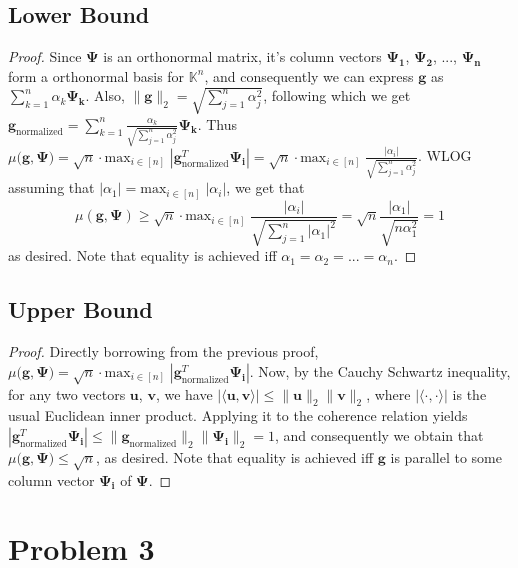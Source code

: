 \documentclass[a4paper,11pt]{article}
\numberwithin{definition}{section}
\numberwithin{mytheorem}{subsection}
\begin{document}
\subsection{Lower Bound}
\begin{proof}
Since $\boldsymbol{\Psi}$ is an orthonormal matrix, it's column vectors $\boldsymbol{\Psi_1}$, $\boldsymbol{\Psi_2}$, ..., $\boldsymbol{\Psi_n}$ form a orthonormal basis for $\mathbb{K}^n$, and consequently we can express $\boldsymbol{g}$ as $\sum_{k=1}^{n} \alpha_k\boldsymbol{\Psi_k}$. Also, $\lVert \boldsymbol{g}\rVert_2 = \sqrt{\sum_{j=1}^{n} \alpha^2_j}$, following which we get $\boldsymbol{g}_{\mathrm{normalized}} = \sum_{k=1}^{n} \frac{\alpha_k}{\sqrt{\sum_{j=1}^{n} \alpha^2_j}}\boldsymbol{\Psi_k}$. Thus $\mu(\boldsymbol{g, \Psi)} = \sqrt{n}\cdot\mathrm{max}_{i\in[n]}\;|\boldsymbol{g}_{\mathrm{normalized}}^T\boldsymbol{\Psi_i}| = \sqrt{n}\cdot\mathrm{max}_{i\in[n]}\;\frac{|\alpha_i|}{\sqrt{\sum_{j=1}^{n} \alpha^2_j}}$. WLOG assuming that $|\alpha_1| = \mathrm{max}_{i\in[n]}\;|\alpha_i|$, we get that
$$\mu(\boldsymbol{g, \Psi}) \geq \sqrt{n}\cdot\mathrm{max}_{i\in[n]}\;\frac{|\alpha_i|}{\sqrt{\sum_{j=1}^{n} |\alpha_1|^2}} = \sqrt{n}\frac{|\alpha_1|}{\sqrt{n\alpha^2_1}} = 1$$
as desired. Note that equality is achieved iff $\alpha_1 = \alpha_2 = ... = \alpha_n$.
\end{proof}
\subsection{Upper Bound}
\begin{proof}
Directly borrowing from the previous proof, $\mu(\boldsymbol{g, \Psi)} = \sqrt{n}\cdot\mathrm{max}_{i\in[n]}\;|\boldsymbol{g}_{\mathrm{normalized}}^T\boldsymbol{\Psi_i}|$. Now, by the Cauchy Schwartz inequality, for any two vectors $\mathbf{u}$, $\mathbf{v}$, we have $|\langle \mathbf{u}, \mathbf{v}\rangle|\leq \lVert \mathbf{u}\rVert_2\lVert \mathbf{v}\rVert_2$, where $|\langle \cdot, \cdot\rangle|$ is the usual Euclidean inner product. Applying it to the coherence relation yields $|\boldsymbol{g}_{\mathrm{normalized}}^T\boldsymbol{\Psi_i}| \leq \lVert \boldsymbol{g}_{\mathrm{normalized}}\rVert_2\lVert \boldsymbol{\Psi_i}\rVert_2 = 1$, and consequently we obtain that $\mu(\boldsymbol{g, \Psi)} \leq \sqrt{n}$, as desired. Note that equality is achieved iff $\boldsymbol{g}$ is parallel to some column vector $\boldsymbol{\Psi_i}$ of $\boldsymbol{\Psi}$.
\end{proof}

\newpage
\section{Problem 3}
\end{document}
